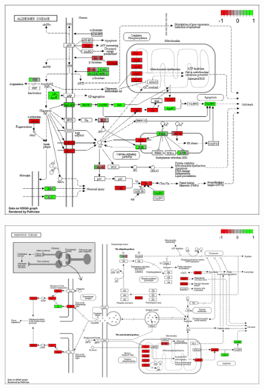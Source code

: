 \begin{figure}[H]
\centering
\includegraphics[width=\textwidth, keepaspectratio]{img/ticorser/functional/alzheimer.png}
\caption[ticorser alzheimer keggmap]{}
\label{fig:ticorsergo}
\end{figure}

\begin{figure}[H]
\centering
\includegraphics[width=\textwidth, keepaspectratio]{img/ticorser/functional/parkinson.png}
\caption[ticorser parkinson keggmap]{}
\label{fig:ticorsergo}
\end{figure}






